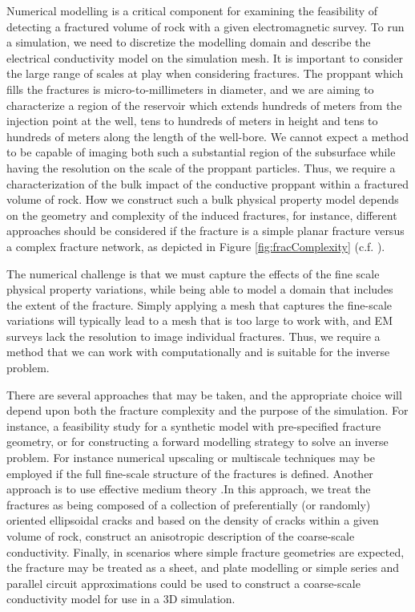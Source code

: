Numerical modelling is a critical component for examining the feasibility of detecting a fractured volume of rock with a given electromagnetic survey. To run a simulation, we need to discretize the modelling domain and describe the electrical conductivity model on the simulation mesh. It is important to consider the large range of scales at play when considering fractures. The proppant which fills the fractures is micro-to-millimeters in diameter, and we are aiming to characterize a region of the reservoir which extends hundreds of meters from the injection point at the well, tens to hundreds of meters in height and tens to hundreds of meters along the length of the well-bore. We cannot expect a method to be capable of imaging both such a substantial region of the subsurface while having the resolution on the scale of the proppant particles. Thus, we require a characterization of the bulk impact of the conductive proppant within a fractured volume of rock. How we construct such a bulk physical property model depends on the geometry and complexity of the induced fractures, for instance, different approaches should be considered if the fracture is a simple planar fracture versus a complex fracture network, as depicted in Figure \ref{fig:fracComplexity} (c.f. \cite{Cipolla2008}).

The numerical challenge is that we must capture the effects of the fine scale physical property variations, while being able to model a domain that includes the extent of the fracture. Simply applying a mesh that captures the fine-scale variations will typically lead to a mesh that is too large to work with, and EM surveys lack the resolution to image individual fractures. Thus, we require a method that we can work with computationally and is suitable for the inverse problem.

There are several approaches that may be taken, and the appropriate choice will depend upon both the fracture complexity and the purpose of the simulation. For instance, a feasibility study for a synthetic model with pre-specified fracture geometry, or for constructing a forward modelling strategy to solve an inverse problem. For instance numerical upscaling \citep{CaudilloMata2014, CaudilloMata2016} or multiscale techniques \citep{Haber2014} may be employed if the full fine-scale structure of the fractures is defined. Another approach is to use effective medium theory \citep{Torquato2002, Milton2002, Berryman2013}.In this approach, we treat the fractures as being composed of a collection of preferentially (or randomly) oriented ellipsoidal cracks and based on the density of cracks within a given volume of rock, construct an anisotropic description of the coarse-scale conductivity. Finally, in scenarios where simple fracture geometries are expected, the fracture may be treated as a sheet, and plate modelling or simple series and parallel circuit approximations could be used to construct a coarse-scale conductivity model for use in a 3D simulation.


